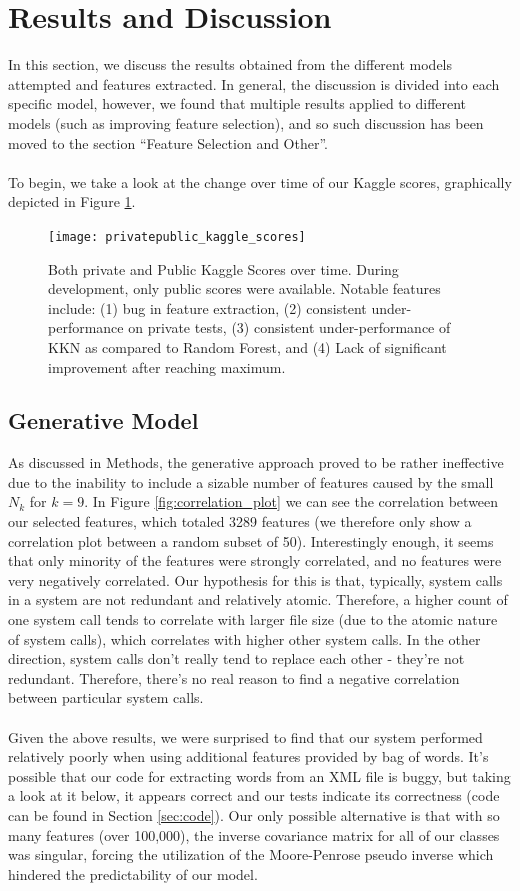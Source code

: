 \documentclass[letterpaper]{article}
\begin{document}
\section{Results and Discussion}
In this section, we discuss the results obtained from the different models attempted and features extracted. In general, the discussion is divided into each specific model, however, we found that multiple results applied to different models (such as improving feature selection), and so such discussion has been moved to the section ``Feature Selection and Other''.\\
\\
\noindent To begin, we take a look at the change over time of our Kaggle scores, graphically depicted in Figure \ref{fig:scores}.

\begin{figure}[h!]
 \centering
 \texttt{[image: privatepublic\_kaggle\_scores]}
 \caption{Both private and Public Kaggle Scores over time. During development, only public scores were available. Notable features include: (1) bug in feature extraction, (2) consistent under-performance on private tests, (3) consistent under-performance of  KKN as compared to Random Forest, and (4) Lack of significant improvement after reaching maximum.}
 \label{fig:scores}
\end{figure}

\subsection{Generative Model}
\noindent As discussed in Methods, the generative approach proved to be rather ineffective due to the inability to include a sizable number of features caused by the small $N_k$ for $k= 9$. In Figure \ref{fig:correlation_plot} we can see the correlation between our selected features, which totaled 3289 features (we therefore only show a correlation plot between a random subset of 50). Interestingly enough, it seems that only minority of the features were strongly correlated, and no features were very negatively correlated. Our hypothesis for this is that, typically, system calls in a system are not redundant and relatively atomic. Therefore, a higher count of one system call tends to correlate with larger file size (due to the atomic nature of system calls), which correlates with higher other system calls. In the other direction, system calls don't really tend to replace each other - they're not redundant. Therefore, there's no real reason to find a negative correlation between particular system calls.\\
\\
\noindent Given the above results, we were surprised to find that our system performed relatively poorly when using additional features provided by bag of words. It's possible that our code for extracting words from an XML file is buggy, but taking a look at it below, it appears correct and our tests indicate its correctness (code can be found in Section \ref{sec:code}). Our only possible alternative is that with so many features (over 100,000), the inverse covariance matrix for all of our classes was singular, forcing the utilization of the Moore-Penrose pseudo inverse which hindered the predictability of our model.
\end{document}
